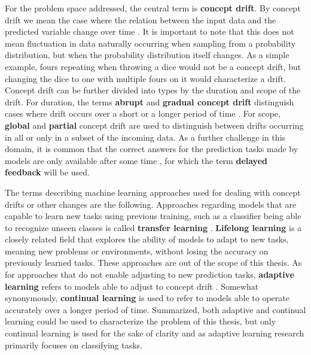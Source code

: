 For the problem space addressed, the central term is \textbf{concept drift}. By concept drift we mean the case where the relation between the input
data and the predicted variable change over time \cite{conceptdriftsurvey} \cite{schlimmerIncrementalLearningNoisy1986}. It is important to note that this does not mean fluctuation in data naturally occurring when sampling from a probability distribution, but when the probability distribution itself changes. As a simple example, fours repeating when throwing a dice would not be a concept drift, but changing the dice to one with multiple fours on it would characterize a drift. Concept drift can be further divided into types by the duration and scope of the drift. For duration, the terms \textbf{abrupt} and \textbf{gradual concept drift} distinguish cases where drift occurs over a short or a longer period of time \cite{zliobaiteAdaptiveTrainingSet2010}. For scope, \textbf{global} and \textbf{partial} concept drift are used to distinguish between drifts occurring in all or only in a subset of the incoming data. As a further challenge in this domain, it is common that the correct answers for the prediction tasks made by models are only available after some time \cite{delayedlabelstreams}, for which the term  \textbf{delayed feedback} will be used. 

The terms describing machine learning approaches used for dealing with concept drifts or other changes are the following. Approaches regarding models that are capable to learn new tasks using previous training, such as a classifier being able to recognize unseen classes is called \textbf{transfer learning} \cite{iotsurvey}. \textbf{Lifelong learning} is a closely related field that explores the ability of models to adapt to new tasks, meaning new problems or environments, without losing the accuracy on previously learned tasks.  These approaches are out of the scope of this thesis. As for approaches that do not enable adjusting to new prediction tasks, \textbf{adaptive learning} refers to models able to adjust to concept drift \cite{conceptdriftsurvey}. Somewhat synonymously, \textbf{continual learning} is used to refer to models able to operate accurately over a longer period of time. Summarized, both adaptive and continual learning could be used to characterize the problem of this thesis, but only continual learning is used for the sake of clarity and as adaptive learning research primarily focuses on classifying tasks.

